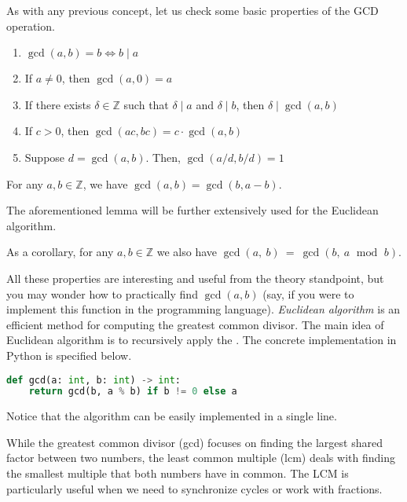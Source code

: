 \documentclass[../lecture-notes-148x210.tex]{subfiles}
\begin{document}
As with any previous concept, let us check some basic properties of the GCD operation.

\begin{lemma} 
    \hfil
    \begin{enumerate}
        \item $\gcd(a, b) = b \iff b \mid a$
        \item If $a \neq 0$, then $\gcd(a, 0) = a$
        \item If there exists $\delta \in \mathbb{Z}$ such that $\delta \mid a$ and $\delta \mid b$, then $\delta \mid \gcd(a, b)$
        \item If $c > 0$, then $\gcd(ac, bc) = c \cdot \gcd(a, b)$
        \item Suppose $d = \gcd(a, b)$. Then, $\gcd(a/d, b/d) = 1$
    \end{enumerate}
\end{lemma}

\begin{lemma}
    For any $a,b \in \mathbb{Z}$, we have $\gcd(a, b) = \gcd(b, a - b)$. 
\end{lemma}

The aforementioned lemma will be further extensively used for the Euclidean algorithm.

\begin{corollary}\label{cor:euclidean}
    As a corollary, for any $a,b \in \mathbb{Z}$ we also have 
    $\gcd(a,~b)~=~\gcd(b,~a~\,~\text{mod}~\,~b)$.
\end{corollary}

All these properties are interesting and useful from the theory standpoint, but
you may wonder how to practically find $\gcd(a, b)$ (say, if you were to
implement this function in the programming language). \emph{Euclidean algorithm} is an
efficient method for computing the greatest common divisor. The main idea of 
Euclidean algorithm is to recursively apply the . The concrete implementation 
in Python is specified below. 
\begin{lstlisting}[language=Python, numbers=none]
def gcd(a: int, b: int) -> int:
    return gcd(b, a % b) if b != 0 else a
\end{lstlisting}

Notice that the algorithm can be easily implemented in a single line.

While the greatest common divisor (gcd) focuses on finding the largest shared factor between two numbers, the least common multiple (lcm) deals with finding the smallest multiple that both numbers have in common. The LCM is particularly useful when we need to synchronize cycles or work with fractions.
\end{document}

